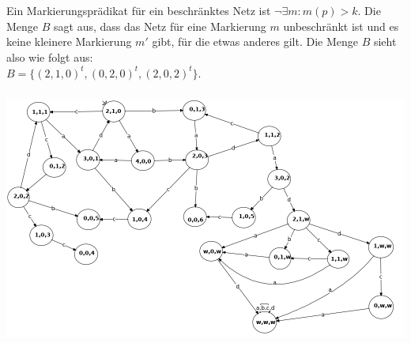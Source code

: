 \documentclass[a4paper,12pt]{scrartcl}
\title{\blatt}
\date{Gruppe 06}
\author{Sabrina Buczko 6663234, Julian Deinert 6535880, Rafael Heid 6704828}
\begin{document}
\maketitle
\newpage
\setcounter{section}{8}
\section{}
\setcounter{subsection}{2}
\subsection{}
\subsubsection{}
Ein Markierungsprädikat für ein beschränktes Netz ist $\neg\exists m:m(p)>k$.
Die Menge $B$ sagt aus, dass das Netz für eine Markierung
$m$ unbeschränkt ist und es keine kleinere
 Markierung $m'$ gibt, für die etwas anderes gilt. Die Menge $B$ sieht also wie folgt aus:\\
 $B = \{(2,1,0)^t,(0,2,0)^t,(2,0,2)^t\}$.
\subsubsection{}
\includegraphics[scale=0.5]{netz.png}
\newpage
\subsection{}
\end{document}
